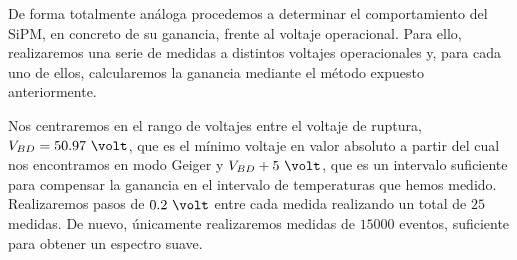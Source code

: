 De forma totalmente análoga procedemos a determinar el comportamiento del SiPM, en concreto de su ganancia, frente al voltaje operacional. Para ello, realizaremos una serie de medidas a distintos voltajes operacionales y, para cada uno de ellos, calcularemos la ganancia mediante el método expuesto anteriormente. 

Nos centraremos en el rango de voltajes entre el voltaje de ruptura, $V_{BD}= 50.97~\volt$, que es el mínimo voltaje en valor absoluto a partir del cual nos encontramos en modo Geiger y $V_{BD}+5~\volt$, que es un intervalo suficiente para compensar la ganancia en el intervalo de temperaturas que hemos medido. Realizaremos pasos de $0.2~\volt$ entre cada medida realizando un total de $25$ medidas. De nuevo, únicamente realizaremos medidas de $15000$ eventos, suficiente para obtener un espectro  suave.

